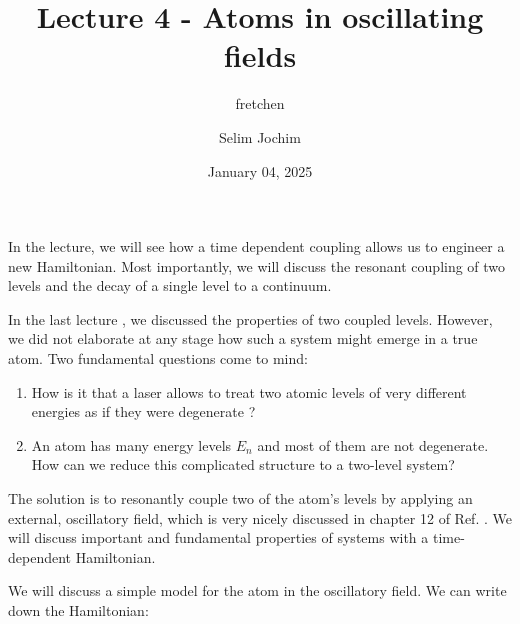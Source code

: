 \documentclass[10pt]{article}
\let\cite\citep
\renewenvironment{abstract}
  {{\bfseries\noindent{\abstractname}\par\nobreak}\footnotesize}
  {\bigskip}
\providecommand\citep{\cite}
\begin{document}
\title{Lecture 4 - Atoms in oscillating fields}



\author[1]{fretchen}%
\author[2]{Selim Jochim}%
%
%


\vspace{-1em}



  
  \date{January 04, 2025}


\begingroup
\let\center\flushleft
\let\endcenter\endflushleft
\maketitle
\endgroup





\begin{abstract}
In the lecture, we will see how a time dependent coupling allows us to engineer a new Hamiltonian. Most importantly,  we will discuss the resonant coupling of two levels and the decay of a single level to a continuum.%
\end{abstract}%



\sloppy


In the last lecture \cite{Jendrzejewski}, we discussed the properties of two coupled levels. However, we did not elaborate at any stage how such a system might emerge in a true atom. Two fundamental questions come to mind:
\begin{enumerate}
\item How is it that a laser allows to treat two atomic levels of very different energies as if they were degenerate ?
\item An atom has many energy levels $E_n$ and most of them are not degenerate. How can we reduce this complicated structure to a two-level system?
\end{enumerate}

The solution is to resonantly couple two of the atom's levels by applying an external, oscillatory field, which is very nicely discussed in chapter 12 of Ref. \cite{2002} \cite{Cohen_Tannoudji_1998}. We will discuss important and fundamental properties of systems with a time-dependent Hamiltonian.

We will discuss a simple model for  the atom in the oscillatory field. We can write down the Hamiltonian:
\end{document}
